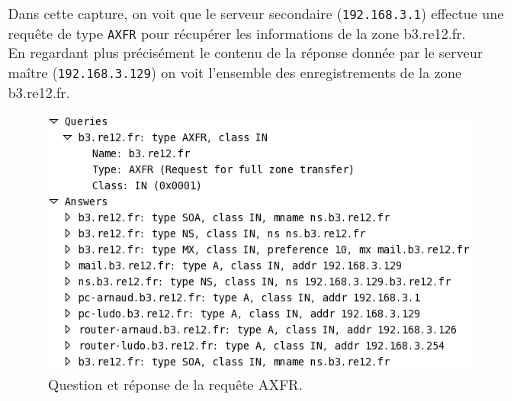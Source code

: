 \documentclass[12pt,a4paper,notitlepage]{article}
\begin{document}
Dans cette capture, on voit que le serveur secondaire (\texttt{192.168.3.1}) effectue une requête de type \texttt{AXFR} pour récupérer les informations de la  zone b3.re12.fr.\\

En regardant plus précisément le contenu de la réponse donnée par le serveur maître (\texttt{192.168.3.129}) on voit l'ensemble des enregistrements de la zone b3.re12.fr.
\begin{figure}[!h]
\begin{center}
\includegraphics[scale=0.55]{axfr}
\caption{Question et réponse de la requête AXFR.}
\label{fig:da}
\end{center}
\end{figure}
\end{document}
